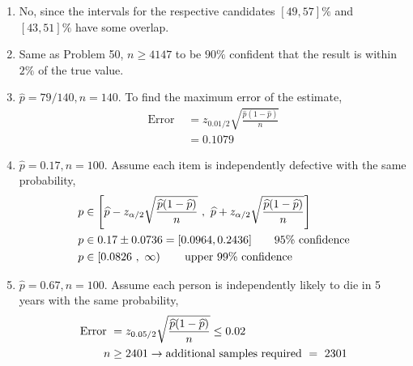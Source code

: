 \begin{enumerate}
	\item No, since the intervals for the respective candidates $ [49, 57]\% $ and $ [43, 51]\% $ have some overlap.\\
	
	\item Same as Problem 50, $ n \geq 4147 $ to be $ 90\% $ confident that the result is within $ 2\% $ of the true value. \\
	
	\item $ \widehat{p}  = 79/140, n = 140$. To find the maximum error of the estimate, \\
	\begin{subequations}
		\begin{align}
			\text{Error } &= z_{0.01/2}\sqrt{\frac{\widehat{p}(1-\widehat{p})}{n}} \nonumber \\
			&= 0.1079
		\end{align}
	\end{subequations}

	\item $ \widehat{p}  = 0.17, n = 100$. Assume each item is independently defective with the same probability, \\
	\begin{subequations}
		\begin{align}
			p &\in \left[ \widehat{p} - z_{\alpha/2}\sqrt{\frac{\widehat{p}(1-\widehat{p})}{n}}\ ,\ \widehat{p} + z_{\alpha/2}\sqrt{\frac{\widehat{p}(1-\widehat{p})}{n}}  \right] \nonumber \\
			p &\in 0.17 \pm 0.0736 = [0.0964, 0.2436] \qquad \text{95\% confidence} \\
			p &\in \left[0.0826\ ,\ \infty \right) \qquad \text{upper 99\% confidence} 
		\end{align}\\
	\end{subequations}

	\item $ \widehat{p}  = 0.67, n = 100$. Assume each person is independently likely to die in 5 years with the same probability, \\
	\begin{subequations}
		\begin{align}
			\text{Error } &= z_{0.05/2}\sqrt{\frac{\widehat{p}(1-\widehat{p})}{n}} \leq 0.02 \nonumber \\
			n &\geq 2401 \to \text{additional samples required}\ =\ 2301
		\end{align}\\
	\end{subequations}


\end{enumerate}
